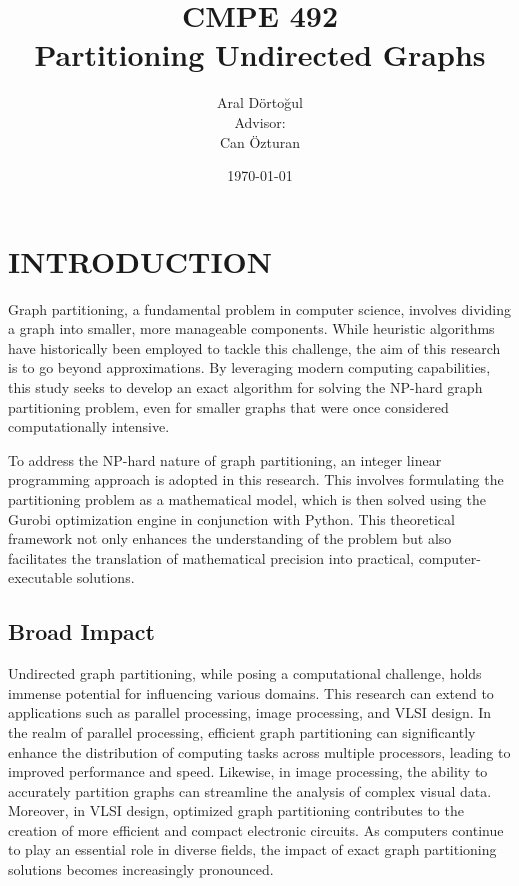 \documentclass[a4paper,12pt]{report}
\begin{document}
\title{CMPE 492 \\ Partitioning Undirected Graphs}
\author{
Aral Dörtoğul\\
Advisor: \\ 
Can Özturan
}
\date{\today}
\maketitle{}
\tableofcontents

\chapter{INTRODUCTION}

Graph partitioning, a fundamental problem in computer science, involves dividing a graph into smaller, more manageable components. While heuristic algorithms have historically been employed to tackle this challenge, the aim of this research is to go beyond approximations. By leveraging modern computing capabilities, this study seeks to develop an exact algorithm for solving the NP-hard graph partitioning problem, even for smaller graphs that were once considered computationally intensive.

To address the NP-hard nature of graph partitioning, an integer linear programming approach is adopted in this research. This involves formulating the partitioning problem as a mathematical model, which is then solved using the Gurobi optimization engine in conjunction with Python. This theoretical framework not only enhances the understanding of the problem but also facilitates the translation of mathematical precision into practical, computer-executable solutions.

\section{Broad Impact}

Undirected graph partitioning, while posing a computational challenge, holds immense potential for influencing various domains. This research can extend to applications such as parallel processing, image processing, and VLSI design. In the realm of parallel processing, efficient graph partitioning can significantly enhance the distribution of computing tasks across multiple processors, leading to improved performance and speed. Likewise, in image processing, the ability to accurately partition graphs can streamline the analysis of complex visual data. Moreover, in VLSI design, optimized graph partitioning contributes to the creation of more efficient and compact electronic circuits. As computers continue to play an essential role in diverse fields, the impact of exact graph partitioning solutions becomes increasingly pronounced.
\end{document}
